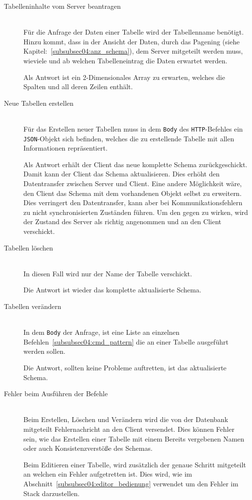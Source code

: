 \begin{description}
\item[Tabelleninhalte vom Server beantragen] \hfill\\
Für die Anfrage der Daten einer Tabelle wird der Tabellenname benötigt. Hinzu kommt, dass in der Ansicht der Daten, durch das Pagening (siehe Kapitel:~\ref{subsubsec04:anz_schema}), dem Server mitgeteilt werden muss, wieviele und ab welchen Tabelleneintrag die Daten erwartet werden.

Als Antwort ist ein 2-Dimensionales Array zu erwarten, welches die Spalten und all deren Zeilen enthält.

\item[Neue Tabellen erstellen] \hfill\\
Für das Erstellen neuer Tabellen muss in dem \texttt{Body} des \texttt{HTTP}-Befehles ein \texttt{JSON}-Objekt sich befinden, welches die zu erstellende Tabelle mit allen Informationen repräsentiert.

Als Antwort erhält der Client das neue komplette Schema zurückgeschickt. Damit kann der Client das Schema aktualisieren.
Dies erhöht den Datentransfer zwischen Server und Client. Eine andere Möglichkeit wäre, den Client das Schema mit dem vorhandenen Objekt selbst zu erweitern. Dies verringert den Datentransfer, kann aber bei Kommunikationsfehlern zu nicht synchronisierten Zuständen führen. Um den gegen zu wirken, wird der Zustand des Server als richtig angenommen und an den Client verschickt.

\item[Tabellen löschen] \hfill\\
In diesen Fall wird nur der Name der Tabelle verschickt. 

Die Antwort ist wieder das komplette aktualisierte Schema.

\item[Tabellen verändern] \hfill\\
In dem \texttt{Body} der Anfrage, ist eine Liste an einzelnen Befehlen~\ref{subsubsec04:cmd_pattern} die an einer Tabelle ausgeführt werden sollen.

Die Antwort, sollten keine Probleme auftretten, ist das aktualisierte Schema.

\item[Fehler beim Ausführen der Befehle] \hfill\\
Beim Erstellen, Löschen und Verändern wird die von der Datenbank mitgeteilt Fehlernachricht an den Client versendet.
Dies können Fehler sein, wie das Erstellen einer Tabelle mit einem Bereits vergebenen Namen oder auch Konsistenzverstöße des Schemas.

Beim Editieren einer Tabelle, wird zusätzlich der genaue Schritt mitgeteilt an welchen ein Fehler aufgetretten ist. Dies wird, wie im Abschnitt~\ref{subsubsec04:editor_bedienung} verwendet um den Fehler im Stack darzustellen.
\end{description}


